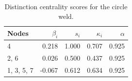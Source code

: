 \begin{table}
\centering
\caption{\label{tab:circleweld}Distinction centrality scores for the circle weld.}
\centering
\begin{tabular}[t]{lrrrr}
\toprule
Nodes & $\beta_i$ & $s_i$ & $\kappa_i$ & $\alpha$\\
\midrule
4 & 0.218 & 1.000 & 0.707 & 0.925\\
2, 6 & 0.026 & 0.500 & 0.437 & 0.925\\
1, 3, 5, 7 & -0.067 & 0.612 & 0.634 & 0.925\\
\bottomrule
\end{tabular}
\end{table}
